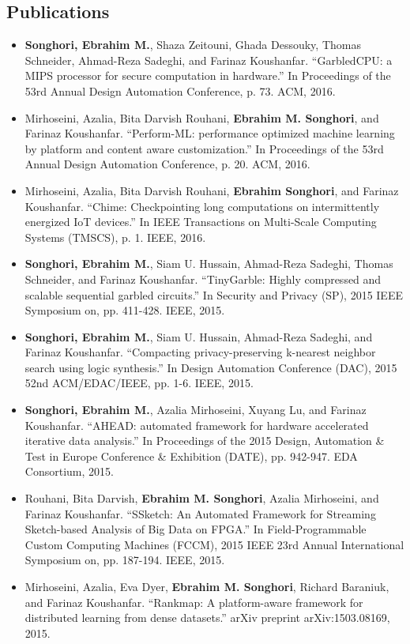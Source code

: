 \documentclass[overlapped]{res}
\begin{document}
\begin{resume}
\section{Publications}
\begin{itemize}
\item {\bf Songhori, Ebrahim M.}, Shaza Zeitouni, Ghada Dessouky, Thomas Schneider, Ahmad-Reza Sadeghi, and Farinaz Koushanfar. ``GarbledCPU: a MIPS processor for secure computation in hardware.'' In Proceedings of the 53rd Annual Design Automation Conference, p. 73. ACM, 2016.
\item Mirhoseini, Azalia, Bita Darvish Rouhani, {\bf Ebrahim M. Songhori}, and Farinaz Koushanfar. ``Perform-ML: performance optimized machine learning by platform and content aware customization.'' In Proceedings of the 53rd Annual Design Automation Conference, p. 20. ACM, 2016.
\item Mirhoseini, Azalia, Bita Darvish Rouhani, {\bf Ebrahim Songhori}, and Farinaz Koushanfar. ``Chime: Checkpointing long computations on intermittently energized IoT devices.'' In IEEE Transactions on Multi-Scale Computing Systems (TMSCS), p. 1. IEEE, 2016.
\item {\bf Songhori, Ebrahim M.}, Siam U. Hussain, Ahmad-Reza Sadeghi, Thomas Schneider, and Farinaz Koushanfar. ``TinyGarble: Highly compressed and scalable sequential garbled circuits.'' In Security and Privacy (SP), 2015 IEEE Symposium on, pp. 411-428. IEEE, 2015.
\item {\bf Songhori, Ebrahim M.}, Siam U. Hussain, Ahmad-Reza Sadeghi, and Farinaz Koushanfar. ``Compacting privacy-preserving k-nearest neighbor search using logic synthesis.'' In Design Automation Conference (DAC), 2015 52nd ACM/EDAC/IEEE, pp. 1-6. IEEE, 2015.
\item {\bf Songhori, Ebrahim M.}, Azalia Mirhoseini, Xuyang Lu, and Farinaz Koushanfar. ``AHEAD: automated framework for hardware accelerated iterative data analysis.'' In Proceedings of the 2015 Design, Automation \& Test in Europe Conference \& Exhibition (DATE), pp. 942-947. EDA Consortium, 2015.
\item Rouhani, Bita Darvish, {\bf Ebrahim M. Songhori}, Azalia Mirhoseini, and Farinaz Koushanfar. ``SSketch: An Automated Framework for Streaming Sketch-based Analysis of Big Data on FPGA.'' In Field-Programmable Custom Computing Machines (FCCM), 2015 IEEE 23rd Annual International Symposium on, pp. 187-194. IEEE, 2015.
\item Mirhoseini, Azalia, Eva Dyer, {\bf Ebrahim M. Songhori}, Richard Baraniuk, and Farinaz Koushanfar. ``Rankmap: A platform-aware framework for distributed learning from dense datasets.'' arXiv preprint arXiv:1503.08169, 2015.

\end{itemize}
\end{resume}
\end{document}
